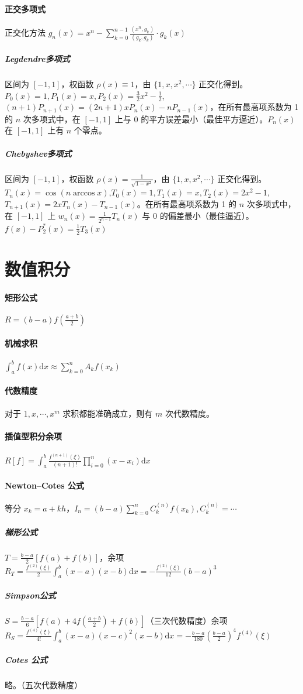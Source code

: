 \documentclass[twocolumn]{ctexart}
\def\dd{\mathrm{d}}
\begin{document}
\paragraph{正交多项式} 正交化方法 $g_n(x)=x^n-\sum_{k=0}^{n-1}\frac{(x^n,g_k)}{(g_k,g_k)}\cdot g_k(x)$
\subparagraph{Legdendre多项式} 区间为 $[-1,1]$，权函数 $\rho(x)\equiv 1$，由 $\{1,x,x^2,\cdots\}$ 正交化得到。$P_0(x)=1,P_1(x)=x,P_2(x)=\frac{3}{2}x^2-\frac{1}{2}$,$(n+1)P_{n+1}(x)=(2n+1)xP_n(x)-nP_{n-1}(x)$，在所有最高项系数为 1 的 $n$ 次多项式中，在 $[-1,1]$ 上与 0 的平方误差最小（最佳平方逼近）。$P_n(x)$ 在 $[-1,1]$ 上有 $n$ 个零点。
\subparagraph{Chebyshev多项式} 区间为 $[-1,1]$，权函数 $\rho(x)=\frac{1}{\sqrt{1-x^2}}$，由 $\{1,x,x^2,\cdots\}$ 正交化得到。$T_n(x)=\cos(n\arccos x)$,$T_0(x)=1,T_1(x)=x,T_2(x)=2x^2-1$,$T_{n+1}(x)=2xT_n(x)-T_{n-1}(x)$。在所有最高项系数为 1 的 $n$ 次多项式中，在 $[-1,1]$ 上 $w_n(x)=\frac{1}{2^{n-1}}T_n(x)$ 与 0 的偏差最小（最佳逼近）。$f(x)-P_2^*(x)=\frac{1}{2}T_3(x)$


\section{数值积分}

\paragraph{矩形公式} $R=(b-a)f\left(\frac{a+b}{2}\right)$
\paragraph{机械求积} $\int_{a}^b f(x)\dd x\approx \sum_{k=0}^nA_kf(x_k)$
\paragraph{代数精度} 对于 $1,x,\cdots,x^m$ 求积都能准确成立，则有 $m$ 次代数精度。
\paragraph{插值型积分余项} $R[f]=\int_a^b\frac{f^{(n+1)}(\xi)}{(n+1)!}\prod_{i=0}^n(x-x_i)\dd x$

\paragraph{Newton--Cotes 公式} 等分 $x_k=a+kh$，$I_n=(b-a)\sum_{k=0}^n C_k^{(n)}f(x_k),C_k^{(n)}=\cdots$
\subparagraph{梯形公式} $T=\frac{b-a}{2}[f(a)+f(b)]$，余项 $R_T=\frac{f^{(2)}(\xi)}{2}\int_a^b (x-a)(x-b)\dd x=-\frac{f^{(2)}(\xi)}{12}(b-a)^3$
\subparagraph{Simpson公式} $S=\frac{b-a}{6}[f(a)+4f\left(\frac{a+b}{2}\right)+f(b)]$（三次代数精度）余项 $R_S=\frac{f^{(4)}(\xi)}{4!}\int_a^b (x-a)(x-c)^2(x-b)\dd x=-\frac{b-a}{180}\left(\frac{b-a}{2}\right)^4f^{(4)}(\xi)$
\subparagraph{Cotes 公式} 略。（五次代数精度）
\end{document}
